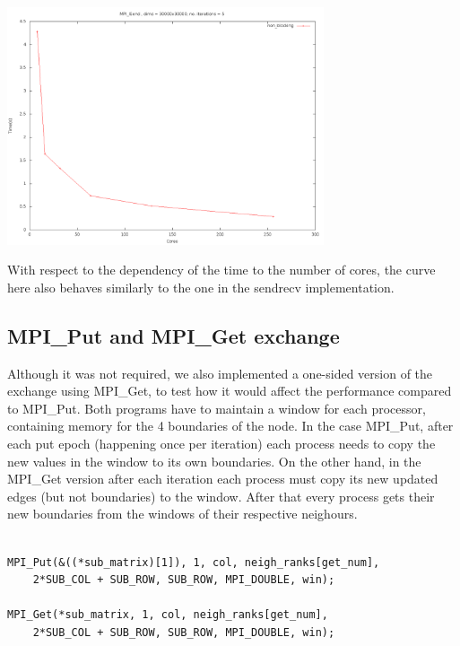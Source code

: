 \documentclass[11pt]{article}
\begin{document}
\begin{center}
\includegraphics[width=0.7\textwidth]{nbcxt.png}
\end{center}

With respect to the dependency of the time to the number of cores, the curve here also behaves similarly to the one in the sendrecv implementation.

\subsection{MPI\_Put and MPI\_Get exchange}
Although it was not required, we also implemented a one-sided version of the exchange using MPI\_Get, to test how it would affect the performance 
compared to MPI\_Put. Both programs have to maintain a window for each processor, containing memory for the 4 boundaries of the node. In the case
MPI\_Put, after each put epoch (happening once per iteration) each process needs to copy the new values in the window to its own boundaries. On the
other hand, in the MPI\_Get version after each iteration each process must copy its new updated edges (but not boundaries) to the window. After that
every process gets their new boundaries from the windows of their respective neighours.
\begin{lstlisting}[label=some-code, caption=Left MPI\_Put vs left MPI\_Get call]
      
MPI_Put(&((*sub_matrix)[1]), 1, col, neigh_ranks[get_num], 
    2*SUB_COL + SUB_ROW, SUB_ROW, MPI_DOUBLE, win);

MPI_Get(*sub_matrix, 1, col, neigh_ranks[get_num], 
    2*SUB_COL + SUB_ROW, SUB_ROW, MPI_DOUBLE, win);

\end{lstlisting}
\end{document}

